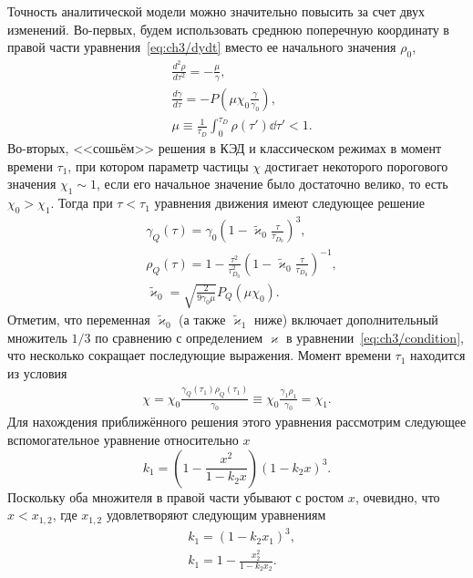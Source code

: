 Точность аналитической модели можно значительно повысить за счет двух изменений.
Во-первых, будем использовать среднюю поперечную координату в правой части уравнения~\eqref{eq:ch3/dydt} вместо ее начального значения $\rho_0$,
\begin{align}
    &\frac{d^2\rho}{d\tau^2} = -\frac{\mu}{\gamma} , \\
    \label{rho2}
    &\frac{d\gamma}{d\tau} = -P \left( \mu \chi_0 \frac{\gamma}{\gamma_0} \right), \\
    &\mu \equiv \frac{1}{\tau_D} \int^{\tau_D}_{0} \rho \left( \tau' \right) \dd \tau' < 1. 
\end{align}
Во-вторых, <<сошьём>> решения в КЭД и классическом режимах в момент времени $\tau_1$, при котором параметр частицы $\chi$ достигает некоторого порогового значения $\chi_1 \sim 1$, если его начальное значение было достаточно велико, то есть $\chi_0 > \chi_1$.
Тогда при $\tau < \tau_1$ уравнения движения имеют следующее решение
\begin{align}
    \label{eq:ch3/gamma_Q}
    &\gamma_Q(\tau) = \gamma_0 \left(1 - \tilde\varkappa_0 \frac{\tau}{\tau_{D_0}} \right)^{3} ,\\
    \label{eq:ch3/rho_Q}
    &\rho_Q(\tau) = 1 - \frac{\tau^2}{\tau_{D_0}^2}\left( 1-\tilde\varkappa_0 \frac{\tau}{\tau_{D_0}} \right)^{-1}, \\
    &\tilde\varkappa_0 = \sqrt{\frac{2}{9\gamma_0\mu}}P_Q(\mu\chi_0).
\end{align}
Отметим, что переменная $\tilde\varkappa_0$ (а также $\tilde\varkappa_1$ ниже) включает дополнительный множитель $1/3$ по сравнению с определением $\varkappa$ в уравнении~\eqref{eq:ch3/condition}, что несколько сокращает последующие выражения.
Момент времени $\tau_1$ находится из условия
\begin{align}
    \label{eq:ch3/chi1}
    \chi = \chi_0 \frac{\gamma_Q(\tau_1) \rho_Q(\tau_1)}{\gamma_0 } \equiv \chi_0 \frac{\gamma_1 \rho_1}{\gamma_0 } = \chi_1.
\end{align}
Для нахождения приближённого решения этого уравнения рассмотрим следующее вспомогательное уравнение относительно $x$
\begin{equation}
    \label{app.zeta}
    k_1 = \left( 1 - \frac{x^2}{1 - k_2 x} \right) \left( 1 - k_2 x \right)^3 .
\end{equation}
Поскольку оба множителя в правой части убывают с ростом $x$, очевидно, что $x < x_{1,2}$, где $x_{1,2}$ удовлетворяют следующим уравнениям
\begin{align}
    &k_1 = {\left(1 - k_2 x_1\right)}^3 ,\\
    &k_1 = 1 - \frac{x_2^2}{1 - k_2 x_2}.
\end{align}
